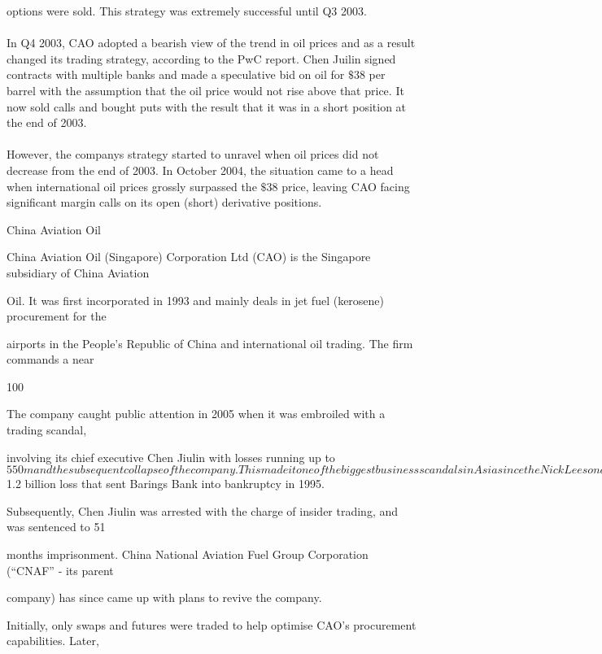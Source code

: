 options were sold. This strategy was extremely successful until Q3
2003. \\\\ In Q4 2003, CAO adopted a bearish view of the trend in
oil prices and as a result changed its trading strategy, according
to the PwC report. Chen Juilin signed contracts with multiple
banks and made a speculative bid on oil for $\$38$ per barrel with
the assumption that the oil price would not rise above that price.
It now sold calls and bought puts with the result that it was in a
short position at the end of 2003. \\\\ However, the companys
strategy started to unravel when oil prices did not decrease from
the end of 2003. In October 2004, the situation came to a head
when international oil prices grossly surpassed the $\$38$ price,
leaving CAO facing significant margin calls on its open (short)
derivative positions.



China Aviation Oil

China Aviation Oil (Singapore) Corporation Ltd (CAO) is the Singapore subsidiary of China Aviation

Oil. It was first incorporated in 1993 and mainly deals in jet fuel (kerosene) procurement for the

airports in the People’s Republic of China and international oil trading. The firm commands a near

100%

The company caught public attention in 2005 when it was embroiled with a trading scandal,

involving its chief executive Chen Jiulin with losses running up to $550m and the subsequent

collapse of the company. This made it one of the biggest business scandals in Asia since the Nick

Leeson case with the $1.2 billion loss that sent Barings Bank into bankruptcy in 1995.

Subsequently, Chen Jiulin was arrested with the charge of insider trading, and was sentenced to 51

months imprisonment. China National Aviation Fuel Group Corporation (“CNAF”  ‐  its parent

company) has since came up with plans to revive the company.

Initially, only swaps and futures were traded to help optimise CAO’s procurement capabilities. Later,

